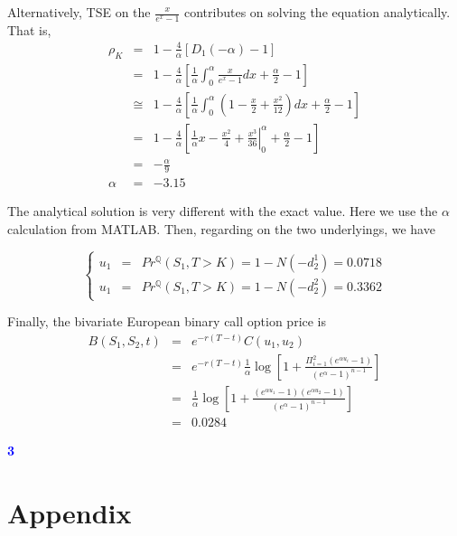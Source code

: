 \documentclass[a4paper,11pt] {article}
\begin{document}
Alternatively, TSE on the $\frac{x}{e^x-1}$ contributes on solving the equation analytically. That is,
\begin{eqnarray*}
\rho_K &=& 1-\frac{4}{\alpha}[D_1(-\alpha)-1]  \\
       &=& 1 - \frac{4}{\alpha}\left[\frac{1}{\alpha} \int_0^\alpha \frac{x}{e^x-1}dx + \frac{\alpha}{2}-1\right]  \\
       &\cong& 1 - \frac{4}{\alpha}\left[\frac{1}{\alpha} \int_0^\alpha (1-\frac{x}{2}+\frac{x^2}{12}) dx + \frac{\alpha}{2}-1\right]  \\
       &=& 1 - \frac{4}{\alpha}\left[\frac{1}{\alpha} \left. x-\frac{x^2}{4} + \frac{x^3}{36} \right|_0^{\alpha} + \frac{\alpha}{2}-1 \right] \\
       &=& -\frac{\alpha}{9} \\
\alpha &=& -3.15
\end{eqnarray*}

The analytical solution is very different with the exact value. Here we use the $\alpha$ calculation from MATLAB. Then, regarding on the two underlyings, we have 

$$ \left\{
\begin{aligned}
u_1 &=& Pr^{\mathbb{Q}}(S_1,T>K) = 1 - N(-d_2^1) = 0.0718 \\
u_1 &=& Pr^{\mathbb{Q}}(S_1,T>K) = 1 - N(-d_2^2) = 0.3362 
\end{aligned}
\right.
$$

Finally, the bivariate European binary call option price is
\begin{eqnarray*}
B(S_1,S_2,t) &=& e^{-r(T-t)} C(u_1, u_2) \\
             &=& e^{-r(T-t)} \frac{1}{\alpha} \log\left[ 1+ \frac{\Pi_{i=1}^2 (e^{\alpha u_i}-1)}{(e^{\alpha}-1)^{n-1}} \right] \\
             &=& \frac{1}{\alpha} \log\left[ 1+ \frac{ (e^{\alpha u_1}-1)(e^{\alpha u_2}-1)}{(e^{\alpha}-1)^{n-1}} \right] \\
             &=& 0.0284
\end{eqnarray*}

\bigskip

\textcolor{blue}{\bf 3}


\section*{Appendix}
\begin{spacing}{0.9}






\end{spacing}
\end{document}
